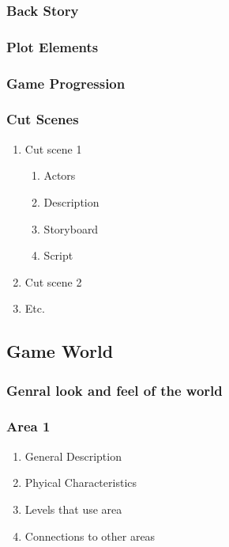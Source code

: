 \documentclass[article, 11pt]{article}
\begin{document}
\subsubsection{Back Story}
\label{sec:org99d40cd}
\subsubsection{Plot Elements}
\label{sec:org5b3d337}
\subsubsection{Game Progression}
\label{sec:org8243dd7}
\subsubsection{Cut Scenes}
\label{sec:org636bd67}
\begin{enumerate}
\item Cut scene 1
\label{sec:org3040d4d}
\begin{enumerate}
\item Actors
\label{sec:orgd47ce13}
\item Description
\label{sec:org7693de3}
\item Storyboard
\label{sec:org8e16ec0}
\item Script
\label{sec:org873ee96}
\end{enumerate}
\item Cut scene 2
\label{sec:org9d07106}
\item Etc.
\label{sec:org7361acd}
\end{enumerate}
\subsection{Game World}
\label{sec:orgce45647}
\subsubsection{Genral look and feel of the world}
\label{sec:orgc93a775}
\subsubsection{Area 1}
\label{sec:orgaadeebf}
\begin{enumerate}
\item General Description
\label{sec:org796ec0f}
\item Phyical Characteristics
\label{sec:orgfd9fab3}
\item Levels that use area
\label{sec:orgf0eb880}
\item Connections to other areas
\label{sec:orgfa9067e}
\end{enumerate}
\end{document}

